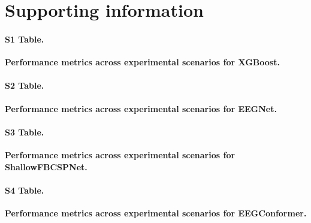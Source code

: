 \documentclass[10pt,letterpaper]{article}
\newcommand{\supportinginformationstyle}{%
  \captionsetup[table]{labelformat=plossupporting,labelsep=period}%
  \setcounter{table}{0}%
  \renewcommand{\thetable}{\arabic{table}}%
}
\begin{document}
\nolinenumbers



\section*{Supporting information}

\supportinginformationstyle


\paragraph*{S1 Table.}
\label{S1_Table}
\textbf{Performance metrics across experimental scenarios for XGBoost.}

\paragraph*{S2 Table.}
\label{S2_Table}
\textbf{Performance metrics across experimental scenarios for EEGNet.}

\paragraph*{S3 Table.}
\label{S3_Table}
\textbf{Performance metrics across experimental scenarios for ShallowFBCSPNet.}

\paragraph*{S4 Table.}
\label{S4_Table}
\textbf{Performance metrics across experimental scenarios for EEGConformer.}
\end{document}
